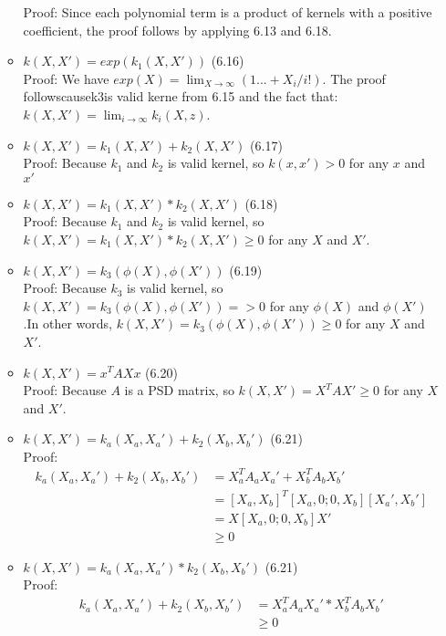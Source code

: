 \documentclass[10.5pt]{article}
\begin{document}
\begin{enumerate}
\begin{itemize}
        Proof: Since each polynomial term is a product of kernels with a positive coefficient, the proof follows by applying 6.13 and 6.18.
        \item $k(X, X') = exp(k_1(X, X'))$                                    (6.16)\\
        Proof: We have $exp(X) = \lim_{X\to\infty}(1 . . . + X_i/i!)$. The proof followscausek3is valid kerne from 6.15 and the fact that: $k(X, X') = \lim_{i\to\infty}k_i(X, z)$.
        \item $k(X, X') = k_1(X, X')+k_2(X, X')$                                 (6.17)\\
        Proof: Because $k_1$ and $k_2$ is valid kernel, so $k(x,x')>0$ for any $x$ and $x'$
        \item  $k(X, X') = k_1(X, X')*k_2(X, X')$                                 (6.18)\\
        Proof: Because $k_1$ and $k_2$ is valid kernel, so $k(X,X')= k_1(X, X')*k_2(X, X') \geq0$ for any $X$ and $X'$.
        \item $k(X, X') = k_3(\phi(X),\phi(X'))$                                    (6.19)\\
        Proof: Because $k_3$ is valid kernel, so $k(X, X')=k_3(\phi(X),\phi(X')) =>0$ for any $\phi(X)$ and $\phi(X')$.In other words, $k(X, X')=k_3(\phi(X),\phi(X')) \geq0$ for any $X$ and $X'$.
        \item $k(X, X') = x^TAXx$                                    (6.20)\\
        Proof: Because $A$ is a PSD matrix, so $k(X, X')=X^TAX'\geq0$ for any $X$ and $X'$. 
        \item $k(X, X') = k_a(X_a, X_a')+k_2(X_b, X_b')$   (6.21)\\
        Proof: \begin{align}
            k_a(X_a, X_a')+k_2(X_b, X_b')&=X_a^TA_aX_a'+X_b^TA_bX_b'\\
            &=[X_a,X_b]^T[X_a,0;0,X_b][X_a',X_b']\\
            &=X[X_a,0;0,X_b]X'\\
            &\geq0
        \end{align}
        \item $k(X, X') = k_a(X_a, X_a')*k_2(X_b, X_b')$   (6.21)\\
        Proof: \begin{align}
            k_a(X_a, X_a')+k_2(X_b, X_b')&=X_a^TA_aX_a'*X_b^TA_bX_b'\\
            &\geq0
        \end{align}

\end{itemize}
\end{enumerate}
\end{document}
